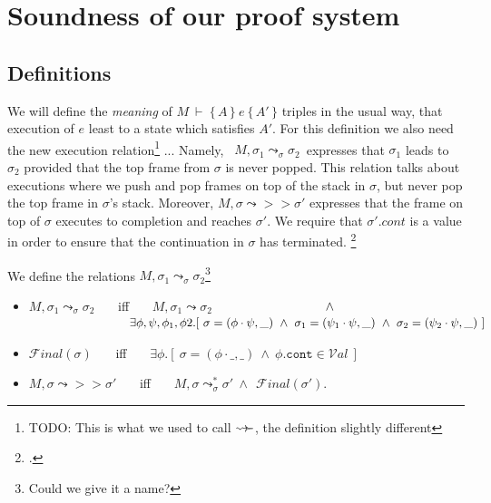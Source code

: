 
\newcommand{\leadstoRec}[4]{\ensuremath{#1, #2 \leadsto_{#3} #4}}
\newcommand{\leadstoRecStar}[4]{\ensuremath{#1, #2  \leadsto^*_{#3} #4}}
\newcommand{\leadstoLoc}[4]{\ensuremath{#1, #2 \leadsto_{!#3} #4}}
\newcommand{\Final}[1]{\ensuremath{{\mathcal F}\!\mathit{inal}(#1)}}
\newcommand{\leadstoFin}[3]%
{\ensuremath{#1, #2 \leadsto\!\! \!>\! \!> {#3} }}
\newcommand{\Values}{\ensuremath{{\mathcal V}\!\mathit{al}}}

\section{Soundness of our proof system}

\subsection{Definitions}

We will define the {\emph {meaning}} of  $M\ \vdash\  \{\, A \,  \}\ e\  \{\, A' \, \}$ triples in the usual way, \ie that execution of $e$ least to a state which satisfies $A'$. For this definition we also need the new execution relation\footnote{TODO: This is what we used to call $\leadsto\!\!\succ$, the definition slightly different} ...
Namely, \ $\leadstoRec {M} {\sigma_1} {\sigma} {\sigma_2}$\  expresses that $\sigma_1$ leads to $\sigma_2$ provided
 that the top frame from $\sigma$ is never popped. This relation talks about executions where we push and pop frames on top of the stack in $\sigma$, but never pop the top frame in $\sigma$'s stack. Moreover, $\leadstoFin {M} {\sigma} {\sigma'}$  expresses that the frame on top of $\sigma$ executes to completion and reaches $\sigma'$.
We require that $\sigma'.cont$ is a value in order to ensure that the continuation in $\sigma$ has terminated. \footnote{ .}



\begin{definition}
We define the relations   $\leadstoRec {M} {\sigma_1} {\sigma} {\sigma_2}$\footnote{Could we give it a name? }
\begin{itemize}
\item
$\leadstoRec {M} {\sigma_1} {\sigma} {\sigma_2}$ \ \ \ iff \ \ \  ${M, \sigma_1} \leadsto {\sigma_2}$
$\strut  \hspace{3cm} \wedge $\\
$\strut  \hspace{2.7cm}\ \    \exists \phi,\psi, \phi_1, \phi2.[ \ \sigma = (\phi\cdot\psi,\_) \ \wedge \ \sigma_1 = (\psi_1\cdot \psi, \_)
\ \wedge\ \sigma_2 = (\psi_2\cdot \psi, \_)\ ] $ 
\item
$\Final {\sigma}$ \ \ \ iff \ \ \  $\exists \phi. [\ \sigma = (\phi\cdot\_,\_) \ \wedge \ \phi.\texttt{cont} \in \Values \ ]$
\item
$\leadstoFin {M} {\sigma} {\sigma'}$ \ \ \ iff \ \ \  $\leadstoRecStar {M} {\sigma} {\sigma} {\sigma'} \ \wedge \ \ \Final{\sigma'}$.
\end{itemize}
\end{definition}


